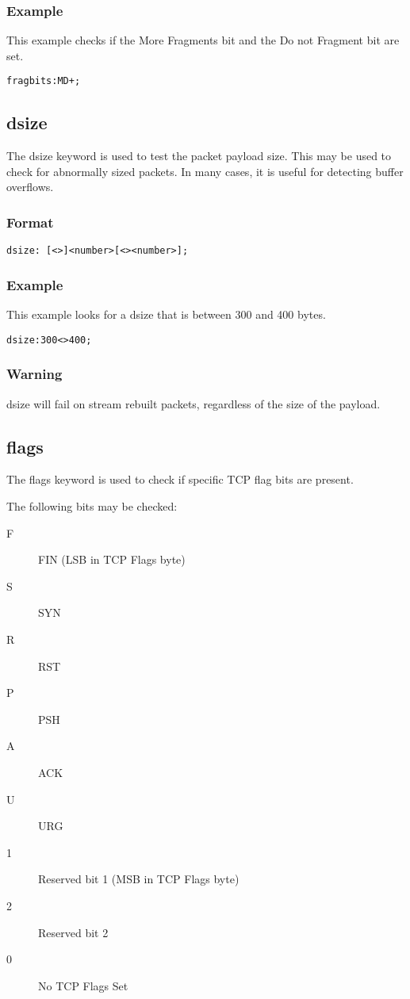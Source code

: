 \documentclass[english]{report}
\begin{document}
\subsubsection{Example}

This example checks if the More Fragments bit and the Do not Fragment bit are
set.
\begin{verbatim}
fragbits:MD+;
\end{verbatim}

\subsection{dsize}

The dsize keyword is used to test the packet payload size.  This may be used to check for abnormally sized packets.  In many cases, it is useful for detecting buffer overflows.

\subsubsection{Format}
\begin{verbatim}
dsize: [<>]<number>[<><number>];
\end{verbatim}

\subsubsection{Example}
This example looks for a dsize that is between 300 and 400 bytes.
\begin{verbatim}
dsize:300<>400;
\end{verbatim}

\subsubsection{Warning}
dsize will fail on stream rebuilt packets, regardless of the size of the
payload.

\subsection{flags}

The flags keyword is used to check if specific TCP flag bits are present.

The following bits may be checked:
\begin{description}
\item [F] FIN (LSB in TCP Flags byte)
\item [S] SYN 
\item [R] RST 
\item [P] PSH 
\item [A] ACK 
\item [U] URG 
\item [1] Reserved bit 1 (MSB in TCP Flags byte)
\item [2] Reserved bit 2 
\item [0] No TCP Flags Set
\end{description}
\end{document}
